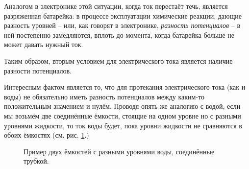 \documentclass[a4paper,twoside]{book}
\begin{document}
Аналогом в электронике этой ситуации, когда ток перестаёт течь, является
разряженная батарейка: в процессе эксплуатации химические реакции, дающие
разность уровней -- или, как говорят в электронике, \emph{разность потенциалов}
-- в ней постепенно замедляются, вплоть до момента, когда батарейка больше не
может давать нужный ток.

Таким образом, вторым условием для электрического тока является наличие разности
потенциалов.

Интересным фактом является то, что для протекания электрического тока (как и
воды) не обязательно иметь разность потенциалов между каким-то положительным
значением и нулём.  Проводя опять же аналогию с водой, если мы возьмём две
соединённые ёмкости, стоящие на одном уровне но с разными уровнями жидкости, то
ток воды будет, пока уровни жидкости не сравняются в обоих ёмкостях
(см. рис. \ref{fig:electronics-circuits-3}.)

\begin{figure}[ht]
  \centering
  \caption{Пример двух ёмкостей с разными уровнями воды, соединённые трубкой.}
  \label{fig:electronics-circuits-3}
\end{figure}
\end{document}
